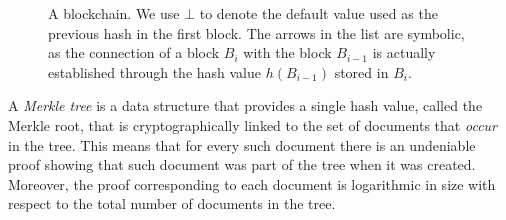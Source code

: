 \begin{figure}
\caption{A blockchain. We use $\bot$ to denote the default value used as the previous hash in the first block. The arrows in the list are symbolic, as the connection of a block $B_i$ with the block $B_{i-1}$ is actually established through the hash value $h(B_{i-1})$ stored in $B_i$.}
\label{hashlist}
\end{figure}

A {\em Merkle tree} is a data structure that provides a single hash value, called the Merkle root, that is cryptographically linked to the set of documents that \emph{occur} in the tree. This means that for every such document there is an undeniable proof showing that such document was part of the tree when it was created. Moreover, the proof corresponding to each document is logarithmic in size with respect to the total number of documents in the tree.

